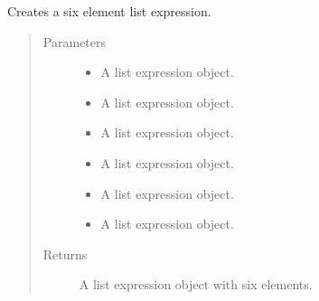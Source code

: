 \documentclass[letterpaper,10pt,english]{sphinxmanual}
\begin{document}

\begin{fulllineitems}
\label{\detokenize{index:secondodb.api.support.secondolistexpr.six_element_list}}
Creates a six element list expression.
\begin{quote}\begin{description}
\item[{Parameters}] \leavevmode\begin{itemize}
\item {} 
 \textendash{} A list expression object.

\item {} 
 \textendash{} A list expression object.

\item {} 
 \textendash{} A list expression object.

\item {} 
 \textendash{} A list expression object.

\item {} 
 \textendash{} A list expression object.

\item {} 
 \textendash{} A list expression object.

\end{itemize}

\item[{Returns}] \leavevmode
A list expression object with six elements.

\end{description}\end{quote}

\end{fulllineitems}

\end{document}
